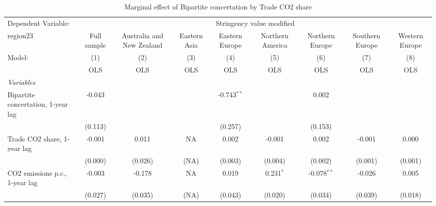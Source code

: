 
\begin{table}[htbp]
   \caption{Marginal effect of Bipartite concertation by Trade CO2 share}
   \centering
   \begin{tabular}{lcccccccc}
      \toprule
      Dependent Variable: & \multicolumn{8}{c}{Stringency value modified}\\
      region23                                                         & Full sample   & Australia and New Zealand & Eastern Asia & Eastern Europe & Northern America & Northern Europe & Southern Europe & Western Europe \\   
      Model:                                                           & (1)           & (2)                       & (3)          & (4)            & (5)              & (6)             & (7)             & (8)\\  
                                                                       &  OLS          & OLS                       & OLS          & OLS            & OLS              & OLS             & OLS             & OLS\\  
      \midrule
      \emph{Variables}\\
      Bipartite concertation, 1-year lag                               & -0.043        &                           &              & -0.743$^{**}$  &                  & 0.002           &                 &   \\   
                                                                       & (0.113)       &                           &              & (0.257)        &                  & (0.153)         &                 &   \\   
      Trade CO2 share, 1-year lag                                      & -0.001        & 0.011                     & NA           & 0.002          & -0.001           & 0.002           & -0.001          & 0.000\\   
                                                                       & (0.000)       & (0.026)                   & (NA)         & (0.003)        & (0.004)          & (0.002)         & (0.001)         & (0.001)\\   
      CO2 emissions p.c., 1-year lag                                   & -0.003        & -0.178                    & NA           & 0.019          & 0.231$^{*}$      & -0.078$^{**}$   & -0.026          & 0.005\\   
                                                                       & (0.027)       & (0.035)                   & (NA)         & (0.043)        & (0.020)          & (0.034)         & (0.039)         & (0.018)\\   

\end{tabular}
\end{table}
